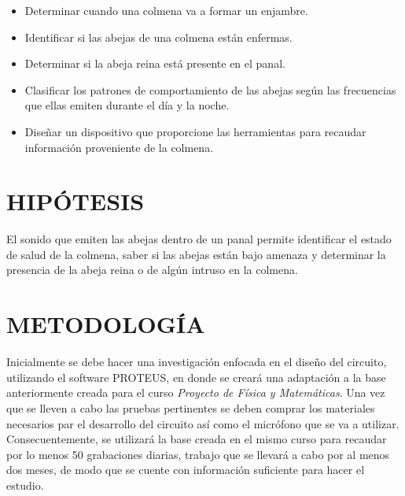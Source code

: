 \documentclass[12pt]{report}
\begin{document}
	\begin{itemize}
		\item Determinar cuando una colmena va a formar un enjambre.
		\item Identificar si las abejas de una colmena están enfermas.
		\item Determinar si la abeja reina está presente en el panal.
		\item Clasificar los patrones de comportamiento de las abejas según las frecuencias que ellas emiten durante el día y la noche.
		\item Diseñar un dispositivo que proporcione las herramientas para recaudar información proveniente de la colmena.
	\end{itemize}


	
	\chapter{HIPÓTESIS}
	
	El sonido que emiten las abejas dentro de un panal permite identificar el estado de salud de la colmena, saber si las abejas están bajo amenaza y determinar la presencia de la abeja reina o de algún intruso en la colmena.
	
	\pagebreak
	\chapter{METODOLOGÍA}
	
	Inicialmente se debe hacer una investigación enfocada en el diseño del circuito, utilizando el software	PROTEUS, en donde se creará una adaptación a la base anteriormente creada para el curso \textit{Proyecto de Física y Matemáticas}. Una vez que se lleven a cabo las pruebas pertinentes se deben comprar los materiales necesarios par el desarrollo del circuito así como el micrófono que se va a utilizar. Consecuentemente, se utilizará la base creada en el mismo curso para recaudar por lo menos 50 grabaciones diarias, trabajo que se llevará a cabo por al menos dos meses, de modo que se cuente con información suficiente para hacer el estudio.
	
\end{document}
